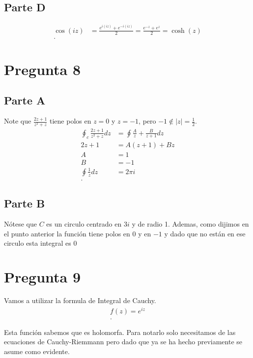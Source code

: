 \documentclass[12pt]{exam}
\begin{document}
\subsection*{Parte D}

\begin{align*}
  \cos\left( iz \right) &= \frac{e^{i\left( iz \right) }+e^{-i\left( iz \right) }}{2}=\frac{e^{-z}+e^{z}}{2}=\cosh\left( z \right)  \\
.\end{align*}

\section*{Pregunta 8}

\subsection*{Parte A}

Note que $\frac{2z+1}{z^2+z}$ tiene polos en $z=0$ y $z=-1$, pero $-1\not\in |z| = \frac{1}{2}$.
\begin{align*}
  \oint_{c} \frac{2z + 1}{z^{2}+z}dz &= \oint \frac{A}{z}+\frac{B}{z+1}dz\\
 2z + 1 &= A\left( z+1 \right) + Bz \\
 A &= 1 \\
 B &= -1 \\
 \oint \frac{1}{z}dz &=  2\pi i \\
.\end{align*}

\subsection*{Parte B}

Nótese que $C$ es un circulo centrado en $3i$ y de radio 1. Ademas, como dijimos en el punto anterior la función tiene polos en $0$ y en $-1$ y dado que no están en ese circulo esta integral es $0$

\section*{Pregunta 9}

Vamos a utilizar la formula de Integral de Cauchy.
\begin{align*}
  f(z) =e^{iz}\\
.\end{align*}

Esta función sabemos que es holomorfa. Para notarlo solo necesitamos de las ecuaciones de Cauchy-Riemmann pero dado que ya se ha hecho previamente se asume como evidente.
\end{document}
